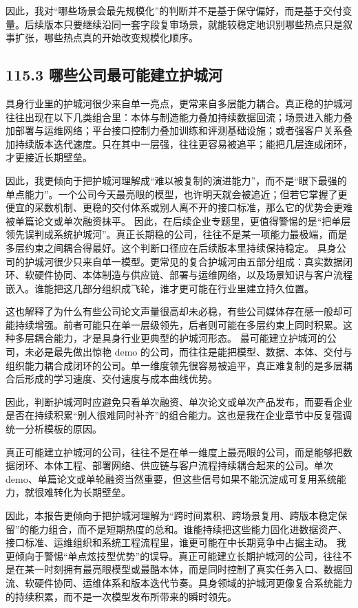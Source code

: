 因此，我对“哪些场景会最先规模化”的判断并不是基于保守偏好，而是基于交付变量。后续版本只要继续沿同一套字段复审场景，就能较稳定地识别哪些热点只是叙事扩张，哪些热点真的开始改变规模化顺序。

\subsection*{115.3 哪些公司最可能建立护城河}


具身行业里的护城河很少来自单一亮点，更常来自多层能力耦合。真正稳的护城河往往出现在以下几类组合里：本体与制造能力叠加持续数据回流；场景进入能力叠加部署与运维网络；平台接口控制力叠加训练和评测基础设施；或者强客户关系叠加持续版本迭代速度。只在其中一层强，往往更容易被追平；能把几层连成闭环，才更接近长期壁垒。

因此，我更倾向于把护城河理解成“难以被复制的演进能力”，而不是“眼下最强的单点能力”。一个公司今天最亮眼的模型，也许明天就会被追近；但若它掌握了更便宜的采数机制、更稳的交付体系或别人离不开的接口标准，那么它的优势会更难被单篇论文或单次融资抹平。 因此，在后续企业专题里，更值得警惕的是“把单层领先误判成系统护城河”。真正长期稳的公司，往往不是某一项能力最极端，而是多层约束之间耦合得最好。这个判断口径应在后续版本里持续保持稳定。 具身公司的护城河很少只来自单一模型。更常见的复合护城河由五部分组成：真实数据闭环、软硬件协同、本体制造与供应链、部署与运维网络，以及场景知识与客户流程嵌入。谁能把这几部分组织成飞轮，谁才更可能在行业里建立持久位置。

这也解释了为什么有些公司论文声量很高却未必稳，有些公司媒体存在感一般却可能持续增强。前者可能只在单一层级领先，后者则可能在多层约束上同时积累。这种多层耦合能力，才是具身行业更典型的护城河形态。 最可能建立护城河的公司，未必是最先做出惊艳 demo 的公司，而往往是能把模型、数据、本体、交付与组织能力耦合成闭环的公司。单一维度领先很容易被追平，真正难复制的是多层耦合后形成的学习速度、交付速度与成本曲线优势。

因此，判断护城河时应避免只看单次融资、单次论文或单次产品发布，而要看企业是否在持续积累“别人很难同时补齐”的组合能力。这也是我在企业章节中反复强调统一分析模板的原因。

真正可能建立护城河的公司，往往不是在单一维度上最亮眼的公司，而是能够把数据闭环、本体工程、部署网络、供应链与客户流程持续耦合起来的公司。单次 demo、单篇论文或单轮融资当然重要，但这些信号如果不能沉淀成可复用系统能力，就很难转化为长期壁垒。

因此，本报告更倾向于把护城河理解为“跨时间累积、跨场景复用、跨版本稳定保留”的能力组合，而不是短期热度的总和。谁能持续把这些能力固化进数据资产、接口标准、运维组织和系统工程流程里，谁更可能在中长期竞争中占据主动。 我更倾向于警惕“单点炫技型优势”的误导。真正可能建立长期护城河的公司，往往不是在某一时刻拥有最亮眼模型或最酷本体，而是同时控制了真实任务入口、数据回流、软硬件协同、运维体系和版本迭代节奏。具身领域的护城河更像复合系统能力的持续积累，而不是一次模型发布所带来的瞬时领先。

